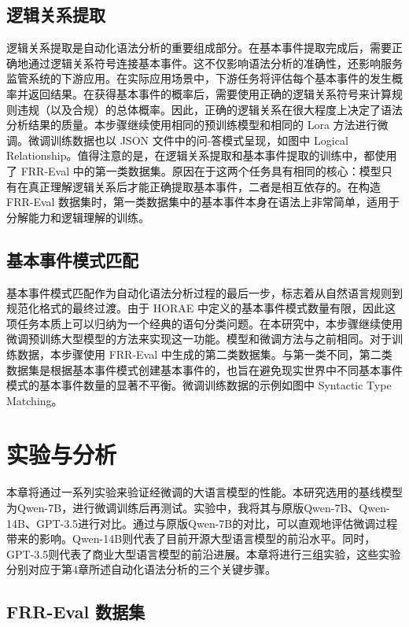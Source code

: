 \subsection{逻辑关系提取}

逻辑关系提取是自动化语法分析的重要组成部分。在基本事件提取完成后，需要正确地通过逻辑关系符号连接基本事件。这不仅影响语法分析的准确性，还影响服务监管系统的下游应用。在实际应用场景中，下游任务将评估每个基本事件的发生概率并返回结果。在获得基本事件的概率后，需要使用正确的逻辑关系符号来计算规则违规（以及合规）的总体概率。因此，正确的逻辑关系在很大程度上决定了语法分析结果的质量。本步骤继续使用相同的预训练模型和相同的 Lora 方法进行微调。微调训练数据也以 JSON 文件中的问-答模式呈现，如图中 Logical Relationship。值得注意的是，在逻辑关系提取和基本事件提取的训练中，都使用了 FRR-Eval 中的第一类数据集。原因在于这两个任务具有相同的核心：模型只有在真正理解逻辑关系后才能正确提取基本事件，二者是相互依存的。在构造 FRR-Eval 数据集时，第一类数据集中的基本事件本身在语法上非常简单，适用于分解能力和逻辑理解的训练。

\subsection{基本事件模式匹配}

基本事件模式匹配作为自动化语法分析过程的最后一步，标志着从自然语言规则到规范化格式的最终过渡。由于 HORAE 中定义的基本事件模式数量有限，因此这项任务本质上可以归纳为一个经典的语句分类问题。在本研究中，本步骤继续使用微调预训练大型模型的方法来实现这一功能。模型和微调方法与之前相同。对于训练数据，本步骤使用 FRR-Eval 中生成的第二类数据集。与第一类不同，第二类数据集是根据基本事件模式创建基本事件的，也旨在避免现实世界中不同基本事件模式的基本事件数量的显著不平衡。微调训练数据的示例如图中 Syntactic Type Matching。

\newpage

\section{实验与分析}

本章将通过一系列实验来验证经微调的大语言模型的性能。本研究选用的基线模型为Qwen-7B，进行微调训练后再测试。实验中，我将其与原版Qwen-7B、Qwen-14B、GPT-3.5进行对比。通过与原版Qwen-7B的对比，可以直观地评估微调过程带来的影响。Qwen-14B则代表了目前开源大型语言模型的前沿水平。同时，GPT-3.5则代表了商业大型语言模型的前沿进展。本章将进行三组实验，这些实验分别对应于第4章所述自动化语法分析的三个关键步骤。

\subsection{FRR-Eval 数据集}


